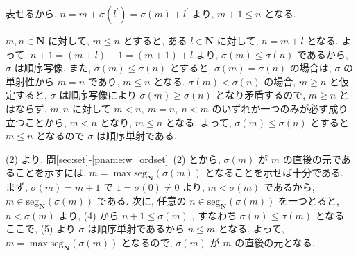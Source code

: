 \begin{nmprob}
{表せるから, $n = m + \sigma (l^{'}) = \sigma (m) + l^{'}$ より, $m + 1 \leq n$ となる. 
\item $m, n\in \bm{N}$ に対して, $m \leq n$ とすると, ある $l \in \bm{N}$ に対して, $n = m + l$ となる.
よって, $n + 1 = (m + l) + 1 = (m + 1) + l$ より, $\sigma (m) \leq \sigma (n)$ であるから, $\sigma$ は順序写像. また, $\sigma (m) \leq \sigma (n)$ とすると,
$\sigma (m) = \sigma (n)$ の場合は, $\sigma$ の単射性から $m = n$ であり, $m \leq n$ となる. $\sigma (m) < \sigma (n)$ の場合, $m \geq n$ と仮定すると, $\sigma$ は順序写像により $\sigma (m) \geq \sigma (n)$ となり矛盾するので,
$m \geq n$ とはならず, $m, n$ に対して $m < n,\ m = n,\ n < m$ のいずれか一つのみが必ず成り立つことから, $m < n$ となり, $m \leq n$ となる. よって, $\sigma (m) \leq \sigma (n)$ とすると $m \leq n$ となるので $\sigma$ は順序単射である.
\item (2) より, 問\ref{sec:set}-\ref{pname:w_ordset}\ (2) とから, $\sigma (m)$ が $m$ の直後の元であることを示すには, $m = \max \text{seg}_{\bm{N}}(\sigma (m))$ となることを示せば十分である.\\
まず, $\sigma (m) = m + 1$ で $1 = \sigma (0) \neq 0$ より, $m < \sigma (m)$ であるから, $m \in \text{seg}_{\bm{N}}(\sigma (m))$ である.
次に, 任意の $n \in \text{seg}_{\bm{N}}(\sigma (m))$ を一つとると, $n < \sigma (m)$ より, (4) から $n + 1 \leq \sigma (m)$ , すなわち $\sigma (n) \leq \sigma (m)$ となる.
ここで, (5) より $\sigma$ は順序単射であるから $n \leq m$ となる. よって, $m = \max \text{seg}_{\bm{N}}(\sigma (m))$ となるので, $\sigma (m)$ が $m$ の直後の元となる.
}
\end{nmprob}




